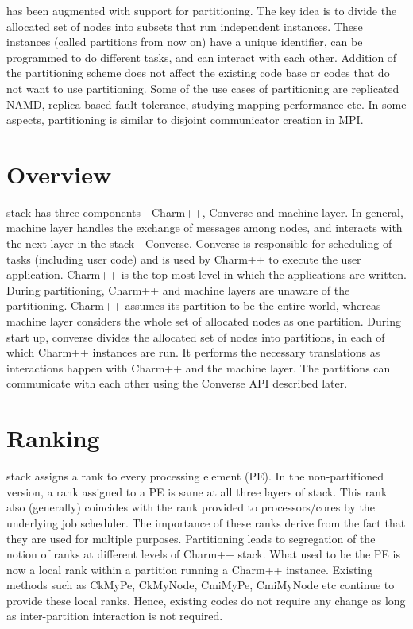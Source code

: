 \charmpp has been augmented with support for partitioning. The key idea is to
divide the allocated set of nodes into subsets that run independent \charmpp
instances. These \charmpp instances (called partitions from now on) have a
unique identifier, can be programmed to do different tasks, and can interact
with each other. Addition of the partitioning scheme does not affect the
existing code base or codes that do not want to use partitioning. Some of the use
cases of partitioning are replicated NAMD, replica based fault tolerance,
studying mapping performance etc. In some aspects, partitioning is similar to 
disjoint communicator creation in MPI. 

\section{Overview}
\charmpp stack has three components - Charm++, Converse and machine layer. In
general, machine layer handles the exchange of messages among nodes, and
interacts with the next layer in the stack - Converse. Converse is responsible
for scheduling of tasks (including user code) and is used by Charm++ to execute
the user application. Charm++ is the top-most level in which the applications
are written. During partitioning, Charm++ and machine layers are unaware of
the partitioning. Charm++ assumes its partition to be the entire world, whereas
machine layer considers the whole set of allocated nodes as one partition.
During start up, converse divides the allocated set of nodes into partitions, in
each of which Charm++ instances are run. It performs the necessary translations
as interactions happen with Charm++ and the machine layer.  The partitions can 
communicate with each other using the Converse API described later.

\section{Ranking}
\charmpp stack assigns a rank to every processing element (PE). In the non-partitioned
version, a rank assigned to a PE is same at all three layers of \charmpp
stack. This rank also (generally) coincides with the rank provided to processors/cores 
by the underlying job scheduler. The importance of these ranks derive from the 
fact that they are used for multiple purposes. Partitioning leads to segregation of the 
notion of ranks at different levels of Charm++ stack. What used to be the PE is now a 
local rank within a partition running a Charm++ instance. Existing methods such as CkMyPe,
CkMyNode, CmiMyPe, CmiMyNode etc continue to provide these local ranks. Hence, existing 
codes do not require any change as long as inter-partition interaction is not required. 

